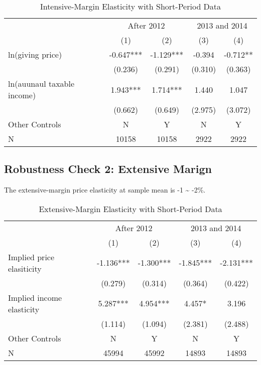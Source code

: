 \documentclass[ review  , 3p ]{elsarticle}
\begin{document}
  \begin{table}
  
  \caption{\label{tab:kableShortElasticity2Slide1}Intensive-Margin Elasticity with Short-Period Data}
  \centering
  \fontsize{8}{10}\selectfont
  \begin{tabular}[t]{lcccc}
  \toprule
  \multicolumn{1}{c}{ } & \multicolumn{2}{c}{After 2012} & \multicolumn{2}{c}{2013 and 2014} \\
  \cmidrule(l{3pt}r{3pt}){2-3} \cmidrule(l{3pt}r{3pt}){4-5}
   & (1) & (2) & (3) & (4)\\
  \midrule
  ln(giving price) & -0.647*** & -1.129*** & -0.394 & -0.712**\\
   & (0.236) & (0.291) & (0.310) & (0.363)\\
  ln(auunaul taxable income) & 1.943*** & 1.714*** & 1.440 & 1.047\\
   & (0.662) & (0.649) & (2.975) & (3.072)\\
  Other Controls & N & Y & N & Y\\
  N & 10158 & 10158 & 2922 & 2922\\
  \bottomrule
  \end{tabular}
  \end{table}
  
  \hypertarget{robustness-check-2-extensive-marign}{%
  \subsection{Robustness Check 2: Extensive Marign}\label{robustness-check-2-extensive-marign}}
  
  The extensive-margin price elasticity at sample mean is -1 \textasciitilde{} -2\%.
  
  \begin{table}
  
  \caption{\label{tab:kableShortElasticity2Slide2}Extensive-Margin Elasticity with Short-Period Data}
  \centering
  \fontsize{8}{10}\selectfont
  \begin{tabular}[t]{lcccc}
  \toprule
  \multicolumn{1}{c}{ } & \multicolumn{2}{c}{After 2012} & \multicolumn{2}{c}{2013 and 2014} \\
  \cmidrule(l{3pt}r{3pt}){2-3} \cmidrule(l{3pt}r{3pt}){4-5}
   & (1) & (2) & (3) & (4)\\
  \midrule
  Implied price elasiticity & -1.136*** & -1.300*** & -1.845*** & -2.131***\\
   & (0.279) & (0.314) & (0.364) & (0.422)\\
  Implied income elasticity & 5.287*** & 4.954*** & 4.457* & 3.196\\
   & (1.114) & (1.094) & (2.381) & (2.488)\\
  Other Controls & N & Y & N & Y\\
  N & 45994 & 45992 & 14893 & 14893\\
  \bottomrule
  \end{tabular}
  \end{table}
  
\end{document}
